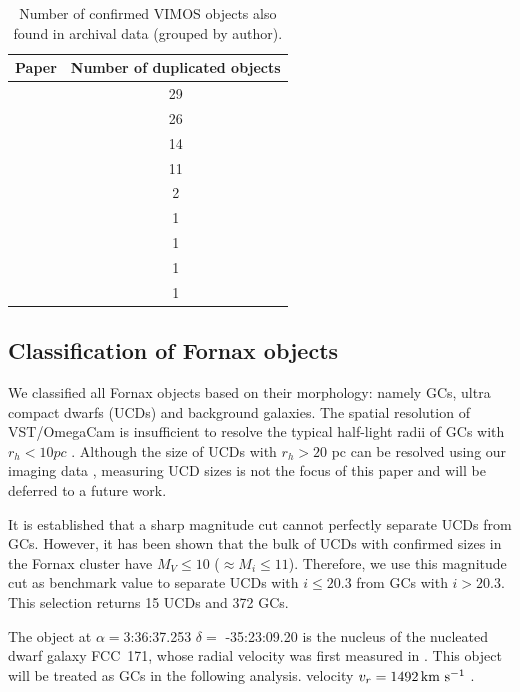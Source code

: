 \documentclass[useAMS,usenatbib]{mn2e}
\newcommand{\kms}{\mbox{\,km~s$^{-1}$}}
\begin{document}
\begin{table}
\centering
\label{mathmode}
\begin{tabular}{@{}l c}
\hline
Paper & Number of duplicated objects \\
\hline
\citet{Dirsch04} &         29 \\
\citet{Schuberth10} &       26 \\
\citet{Bergond07}  &     14 \\
\citet{Firth07}   &      11 \\
\citet{Chilingarian11} &     2 \\
\citet{Mieske04} &       1 \\
\citet{Hilker07}  &     1 \\
\citet{Francis12}   &     1 \\
\citet{Drinkwater00}  &    1 \\
\hline
\end{tabular}
\caption{Number of confirmed VIMOS objects also found in archival data (grouped 
by author). }
\label{tab:authors} 
\end{table}

\subsection{Classification of Fornax objects}

We classified all Fornax objects based on their morphology: namely GCs, ultra 
compact dwarfs (UCDs) and background galaxies. The spatial resolution of 
VST/OmegaCam is insufficient to resolve the typical half-light radii of GCs 
with $r_h < 10 pc$ \citep{Masters, Puzia11}. Although the size of UCDs with 
$r_h > 20$ pc can be resolved using our imaging data \citep{Cantiello15}, 
measuring UCD sizes is not the focus of this paper and will be deferred to a 
future work.

It is established that a sharp magnitude cut cannot perfectly separate UCDs 
from GCs. However, it has been shown \citep{Voggel16, Eigenthaler18} that the 
bulk of UCDs with confirmed sizes in the Fornax cluster have $M_V \le 10$ 
($\approx M_i \le 11$). Therefore, we use this magnitude cut as benchmark value 
to separate UCDs with $i \le 20.3$ from GCs with $i > 20.3$. This selection 
returns 15 UCDs and 372 GCs. 

The object at $\alpha=$3:36:37.253 $\delta=$ -35:23:09.20 is the nucleus of the 
nucleated dwarf galaxy FCC~171, whose radial velocity was first measured in 
\citet{Bergond07}. This object will be treated as GCs in the following 
analysis.  
velocity $v_r = 1492 \kms$ \citet{Chilingarian11}. 
\end{document}
